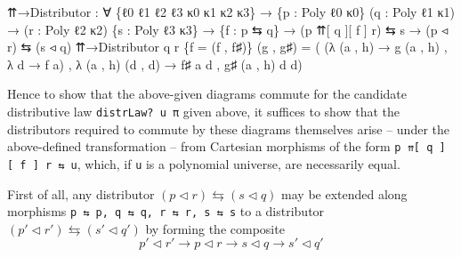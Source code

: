 \documentclass[
  11pt,
  oneside,
  article]{memoir}
\newenvironment{Shaded}{}{}
\newcommand{\NormalTok}[1]{#1}
\newcommand{\OtherTok}[1]{\textcolor[rgb]{0.00,0.44,0.13}{#1}}
\theoremstyle{definition}
\theoremstyle{plain}
\newcommand{\0}{\textsf{0}}
\newcommand{\1}{\tn{\textsf{1}}}
\begin{document}
\begin{Shaded}
\begin{Highlighting}[]
\NormalTok{⇈→Distributor }\OtherTok{:} \OtherTok{∀} \OtherTok{\{}\NormalTok{ℓ0 ℓ1 ℓ2 ℓ3 κ0 κ1 κ2 κ3}\OtherTok{\}}
                \OtherTok{→} \OtherTok{\{}\NormalTok{p }\OtherTok{:}\NormalTok{ Poly ℓ0 κ0}\OtherTok{\}} \OtherTok{(}\NormalTok{q }\OtherTok{:}\NormalTok{ Poly ℓ1 κ1}\OtherTok{)}
                \OtherTok{→} \OtherTok{(}\NormalTok{r }\OtherTok{:}\NormalTok{ Poly ℓ2 κ2}\OtherTok{)} \OtherTok{\{}\NormalTok{s }\OtherTok{:}\NormalTok{ Poly ℓ3 κ3}\OtherTok{\}}
                \OtherTok{→} \OtherTok{\{}\NormalTok{f }\OtherTok{:}\NormalTok{ p ⇆ q}\OtherTok{\}}
                \OtherTok{→} \OtherTok{(}\NormalTok{p ⇈[ q ][ f ] r}\OtherTok{)}\NormalTok{ ⇆ s}
                \OtherTok{→} \OtherTok{(}\NormalTok{p ◃ r}\OtherTok{)}\NormalTok{ ⇆ }\OtherTok{(}\NormalTok{s ◃ q}\OtherTok{)}
\NormalTok{⇈→Distributor q r }\OtherTok{\{}\NormalTok{f }\OtherTok{=} \OtherTok{(}\NormalTok{f , f♯}\OtherTok{)\}} \OtherTok{(}\NormalTok{g , g♯}\OtherTok{)} \OtherTok{=}
    \OtherTok{(} \OtherTok{(λ} \OtherTok{(}\NormalTok{a , h}\OtherTok{)} \OtherTok{→}\NormalTok{ g }\OtherTok{(}\NormalTok{a , h}\OtherTok{)}\NormalTok{ , }\OtherTok{λ}\NormalTok{ d\textquotesingle{} }\OtherTok{→}\NormalTok{ f a}\OtherTok{)} 
\NormalTok{    , }\OtherTok{λ} \OtherTok{(}\NormalTok{a , h}\OtherTok{)} \OtherTok{(}\NormalTok{d\textquotesingle{} , d}\OtherTok{)}
        \OtherTok{→}\NormalTok{ f♯ a d , g♯ }\OtherTok{(}\NormalTok{a , h}\OtherTok{)}\NormalTok{ d\textquotesingle{} d}\OtherTok{)}
\end{Highlighting}
\end{Shaded}

Hence to show that the above-given diagrams commute for the candidate
distributive law \texttt{distrLaw?\ u\ π} given above, it suffices to
show that the distributors required to commute by these diagrams
themselves arise -- under the above-defined transformation -- from
Cartesian morphisms of the form
\texttt{p\ ⇈{[}\ q\ {]}{[}\ f\ {]}\ r\ ⇆\ u}, which, if \texttt{u} is a
polynomial universe, are necessarily equal.

First of all, any distributor
\((p \triangleleft r) \leftrightarrows (s \triangleleft q)\) may be
extended along morphisms
\texttt{p\textquotesingle{}\ ⇆\ p,\ q\ ⇆\ q\textquotesingle{},\ r\textquotesingle{}\ ⇆\ r,\ s\ ⇆\ s\textquotesingle{}}
to a distributor
\((p' \triangleleft r') \leftrightarrows (s' \triangleleft q')\) by
forming the composite \[
p' \triangleleft r' \xrightarrow{} p \triangleleft r \xrightarrow{} s \triangleleft q \xrightarrow{} s' \triangleleft q'
\]
\end{document}
